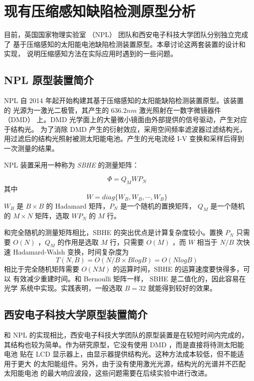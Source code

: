 \chapter{现有压缩感知缺陷检测原型分析}

目前，英国国家物理实验室 （NPL） 团队和西安电子科技大学团队分别独立完成了
基于压缩感知的太阳能电池缺陷检测装置原型。本章讨论这两套装置的设计和实现，
说明压缩感知方法在实际应用时遇到的一些问题。

\section{NPL 原型装置简介}

NPL 自 2014 年起开始构建其基于压缩感知的太阳能缺陷检测装置原型。该装置的
光源为一激光二极管，其产生的 $636.2 nm$ 激光照射在一数字微镜器件 （DMD）
上。DMD 光学面上的大量微小镜面由外部提供的信号驱动，产生对应于结构光。
为了消除 DMD 产生的衍射效应，采用空间频率滤波器过滤结构光，
用过滤后的结构光照射被测太阳能电池。产生的光电流经 I-V
变换和采样后得到一次测量的结果。

NPL 装置采用一种称为 \emph{SBHE} 的测量矩阵：\cite{BlockHadamard}
\begin{definition}[SBHE 矩阵]
\begin{equation}
\Phi = Q_M W P_N
\end{equation}
其中
\begin{equation}
W = diag\{W_B, W_B, \cdots, W_B\}
\end{equation}
$W_B$ 是 $B \times B$ 的 Hadamard 矩阵，$P_N$ 是一个随机的置换矩阵，
$Q_M$ 是一个随机的 $M \times N$ 矩阵，选取 $W P_N$ 的 $M$ 行。
\end{definition}

和完全随机的测量矩阵相比，SBHE 的突出优点是计算复杂度较小。置换
$P_N$ 只需要 $O(N)$ ，$Q_M$ 的作用是选取 $M$ 行，只需要 $O(M)$ ，而
$W$ 相当于 $N/B$ 次快速 Hadamard-Walsh 变换，时间复杂度为
\begin{equation}
T(N,B) = O(N/B \times B log B) = O(NlogB)
\end{equation}
相比于完全随机矩阵需要 $O(NM)$ 的运算时间，SBHE 的运算速度要快得多，可以
有效减少重建时间。和 Bernoulli 矩阵一样， SBHE 是二值化的，因此容易在光学
系统中实现。实践表明，一般选取 $B=32$ 就能得到较好的效果。

\section{西安电子科技大学原型装置简介}

和 NPL 的实现相比，西安电子科技大学团队的原型装置是在较短时间内完成的，
其结构也较为简单。作为研究原型，它没有使用 DMD ，而是直接将待测太阳能电池
贴在 LCD 显示器上，由显示器提供结构光。这种方法成本较低，但不能适用于更大
的太阳能组件。另外，由于没有使用激光光源，结构光的光谱并不匹配太阳能电池
的最大响应波段，这些问题需要在后续实验中进行改进。

